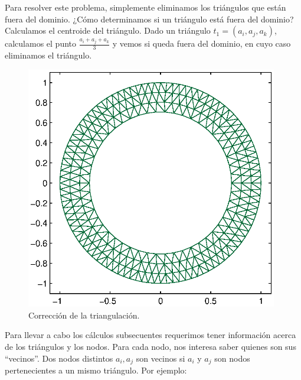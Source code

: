 \documentclass[12pt,spanish,oneside]{book}
\theoremstyle{plain}
\numberwithin{equation}{chapter}
\theoremstyle{definition}
\theoremstyle{remark}
\begin{document}
Para resolver este problema, simplemente eliminamos los triángulos que están fuera del dominio. ¿Cómo determinamos si un triángulo está fuera del dominio? Calculamos el centroide del triángulo. Dado un triángulo $t_1=(a_i,a_j,a_k)$, calculamos el punto $\frac{a_i+a_j+a_k}{3}$ y vemos si queda fuera del dominio, en cuyo caso eliminamos el triángulo. 
\begin{figure}[H]
\centering
\includegraphics[width=11cm]{img/tribien.eps}
\caption{Corrección de la triangulación.}
\label{tribien}
\end{figure}
Para llevar a cabo los cálculos subsecuentes requerimos tener información acerca de los triángulos y los nodos. Para cada nodo, nos interesa saber quienes son sus ``vecinos''. Dos nodos distintos $a_i,a_j$ son vecinos si $a_i$ y $a_j$ son nodos pertenecientes a un mismo triángulo.  Por ejemplo:
\end{document}
